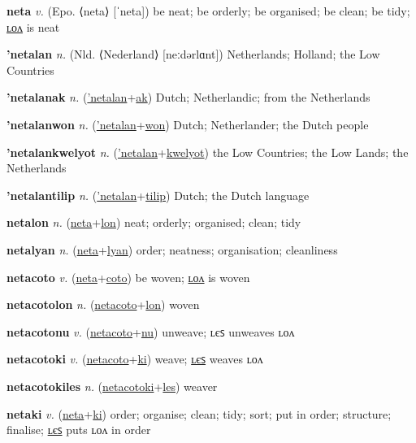 \textbf{\hypertarget{neta}{neta}} \textit{v.} (Epo. ⟨neta⟩ [ˈneta])
be neat; be orderly; be organised; be clean; be tidy; \hyperlink{netalon}{ʟᴏᴧ} is neat

\textbf{\hypertarget{'netalan}{'netalan}} \textit{n.} (Nld. ⟨Nederland⟩ [neːdərlɑnt])
Netherlands; Holland; the Low Countries

\textbf{\hypertarget{'netalanak}{'netalanak}} \textit{n.} (\hyperlink{'netalan}{'netalan}+\allowbreak \hyperlink{ak}{ak})
Dutch; Netherlandic; from the Netherlands

\textbf{\hypertarget{'netalanwon}{'netalanwon}} \textit{n.} (\hyperlink{'netalan}{'netalan}+\allowbreak \hyperlink{won}{won})
Dutch; Netherlander; the Dutch people

\textbf{\hypertarget{'netalankwelyot}{'netalankwelyot}} \textit{n.} (\hyperlink{'netalan}{'netalan}+\allowbreak \hyperlink{kwelyot}{kwelyot})
the Low Countries; the Low Lands; the Netherlands

\textbf{\hypertarget{'netalantilip}{'netalantilip}} \textit{n.} (\hyperlink{'netalan}{'netalan}+\allowbreak \hyperlink{tilip}{tilip})
Dutch; the Dutch language

\textbf{\hypertarget{netalon}{netalon}} \textit{n.} (\hyperlink{neta}{neta}+\allowbreak \hyperlink{lon}{lon})
neat; orderly; organised; clean; tidy

\textbf{\hypertarget{netalyan}{netalyan}} \textit{n.} (\hyperlink{neta}{neta}+\allowbreak \hyperlink{lyan}{lyan})
order; neatness; organisation; cleanliness

\textbf{\hypertarget{netacoto}{netacoto}} \textit{v.} (\hyperlink{neta}{neta}+\allowbreak \hyperlink{coto}{coto})
be woven; \hyperlink{netacotolon}{ʟᴏᴧ} is woven

\textbf{\hypertarget{netacotolon}{netacotolon}} \textit{n.} (\hyperlink{netacoto}{netacoto}+\allowbreak \hyperlink{lon}{lon})
woven

\textbf{\hypertarget{netacotonu}{netacotonu}} \textit{v.} (\hyperlink{netacoto}{netacoto}+\allowbreak \hyperlink{nu}{nu})
unweave; ʟєꜱ unweaves ʟᴏᴧ

\textbf{\hypertarget{netacotoki}{netacotoki}} \textit{v.} (\hyperlink{netacoto}{netacoto}+\allowbreak \hyperlink{ki}{ki})
weave; \hyperlink{netacotokiles}{ʟєꜱ} weaves ʟᴏᴧ

\textbf{\hypertarget{netacotokiles}{netacotokiles}} \textit{n.} (\hyperlink{netacotoki}{netacotoki}+\allowbreak \hyperlink{les}{les})
weaver

\textbf{\hypertarget{netaki}{netaki}} \textit{v.} (\hyperlink{neta}{neta}+\allowbreak \hyperlink{ki}{ki})
order; organise; clean; tidy; sort; put in order; structure; finalise; \hyperlink{netakiles}{ʟєꜱ} puts ʟᴏᴧ in order

